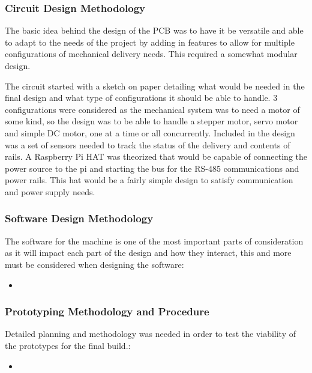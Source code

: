 \documentclass[a4paper,11pt]{article}
\numberwithin{figure}{section}
\begin{document}
\subsubsection{Circuit Design Methodology}
The basic idea behind the design of the PCB was to have it be versatile and able to adapt to the needs of the project by adding in features to allow for multiple configurations of mechanical delivery needs. This required a somewhat modular design.


The circuit started with a sketch on paper detailing what would be needed in the final design and what type of configurations it should be able to handle. 3 configurations were considered as the mechanical system was to need a motor of some kind, so the design was to be able to handle a stepper motor, servo motor and simple DC motor, one at a time or all concurrently. Included in the design was a set of sensors needed to track the status of the delivery and contents of rails.
A Raspberry Pi HAT was theorized that would be capable of connecting the power source to the pi and starting the bus for the RS-485 communications and power rails. This hat would be a fairly simple design to satisfy communication and power supply needs.


\subsubsection{Software Design Methodology}
The software for the machine is one of the most important parts of consideration as it will impact each part of the design and how they interact, this and more must be considered when designing the software:
\begin{itemize}
	\item 	 
\end{itemize}

\subsubsection{Prototyping Methodology and Procedure }
Detailed planning and methodology was needed in order to test the viability of the prototypes for the final build.:
\begin{itemize}
	\item 	 
\end{itemize}

\newpage




\end{document}
